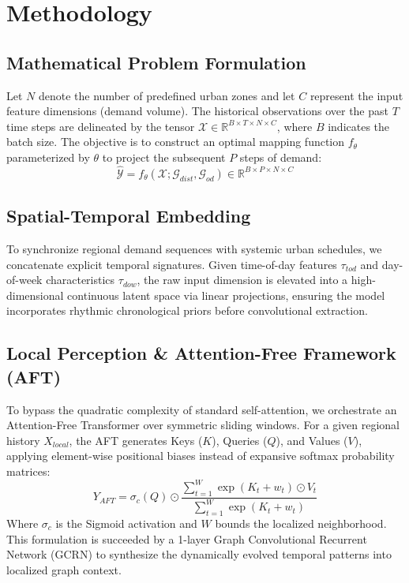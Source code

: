 \documentclass{rapportECL}
\begin{document}
\section{Methodology}

\subsection{Mathematical Problem Formulation}
Let $N$ denote the number of predefined urban zones and let $C$ represent the input feature dimensions (demand volume). The historical observations over the past $T$ time steps are delineated by the tensor $\mathcal{X} \in \mathbb{R}^{B \times T \times N \times C}$, where $B$ indicates the batch size. The objective is to construct an optimal mapping function $f_{\theta}$ parameterized by $\theta$ to project the subsequent $P$ steps of demand:
\begin{equation}
\hat{\mathcal{Y}} = f_{\theta}(\mathcal{X}; \mathcal{G}_{dist}, \mathcal{G}_{od}) \in \mathbb{R}^{B \times P \times N \times C}
\end{equation}

\subsection{Spatial-Temporal Embedding}
To synchronize regional demand sequences with systemic urban schedules, we concatenate explicit temporal signatures. Given time-of-day features $\tau_{tod}$ and day-of-week characteristics $\tau_{dow}$, the raw input dimension is elevated into a high-dimensional continuous latent space via linear projections, ensuring the model incorporates rhythmic chronological priors before convolutional extraction.

\subsection{Local Perception \& Attention-Free Framework (AFT)}
To bypass the quadratic complexity of standard self-attention, we orchestrate an Attention-Free Transformer over symmetric sliding windows. For a given regional history $X_{local}$, the AFT generates Keys ($K$), Queries ($Q$), and Values ($V$), applying element-wise positional biases instead of expansive softmax probability matrices:
\begin{equation}
Y_{AFT} = \sigma_{c}(Q) \odot \frac{\sum_{t=1}^{W} \exp(K_t + w_{t}) \odot V_t}{\sum_{t=1}^{W} \exp(K_t + w_{t})}
\end{equation}
Where $\sigma_{c}$ is the Sigmoid activation and $W$ bounds the localized neighborhood. This formulation is succeeded by a 1-layer Graph Convolutional Recurrent Network (GCRN) to synthesize the dynamically evolved temporal patterns into localized graph context.
\end{document}
